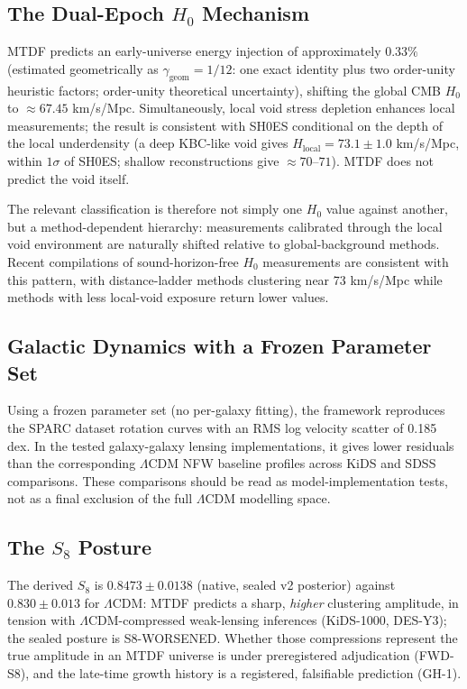\documentclass[11pt,a4paper]{article}
\begin{document}
\subsection{The Dual-Epoch $H_0$ Mechanism}
MTDF predicts an early-universe energy injection of approximately $0.33\%$ (estimated geometrically as $\gamma_{\text{geom}} = 1/12$: one exact identity plus two order-unity heuristic factors; order-unity theoretical uncertainty), shifting the global CMB $H_0$ to $\approx 67.45$ km/\allowbreak{}s/\allowbreak{}Mpc. Simultaneously, local void stress depletion enhances local measurements; the result is consistent with SH0ES conditional on the depth of the local underdensity (a deep KBC-like void gives $H_{\text{local}} = 73.1 \pm 1.0$ km/\allowbreak{}s/\allowbreak{}Mpc, within $1\sigma$ of SH0ES; shallow reconstructions give $\approx 70$--$71$). MTDF does not predict the void itself.

The relevant classification is therefore not simply one $H_0$ value against another, but a method-dependent hierarchy: measurements calibrated through the local void environment are naturally shifted relative to global-background methods. Recent compilations of sound-horizon-free $H_0$ measurements are consistent with this pattern, with distance-ladder methods clustering near 73 km/\allowbreak{}s/\allowbreak{}Mpc while methods with less local-void exposure return lower values.

\subsection{Galactic Dynamics with a Frozen Parameter Set}
Using a frozen parameter set (no per-galaxy fitting), the framework reproduces the SPARC dataset rotation curves with an RMS log velocity scatter of 0.185 dex. In the tested galaxy-galaxy lensing implementations, it gives lower residuals than the corresponding $\Lambda$CDM NFW baseline profiles across KiDS and SDSS comparisons. These comparisons should be read as model-implementation tests, not as a final exclusion of the full $\Lambda$CDM modelling space.

\subsection{The $S_8$ Posture}
The derived $S_8$ is $0.8473 \pm 0.0138$ (native, sealed v2 posterior) against $0.830 \pm 0.013$ for $\Lambda$CDM: MTDF predicts a sharp, \emph{higher} clustering amplitude, in tension with $\Lambda$CDM-compressed weak-lensing inferences (KiDS-1000, DES-Y3); the sealed posture is S8-WORSENED. Whether those compressions represent the true amplitude in an MTDF universe is under preregistered adjudication (FWD-S8), and the late-time growth history is a registered, falsifiable prediction (GH-1).
\end{document}
